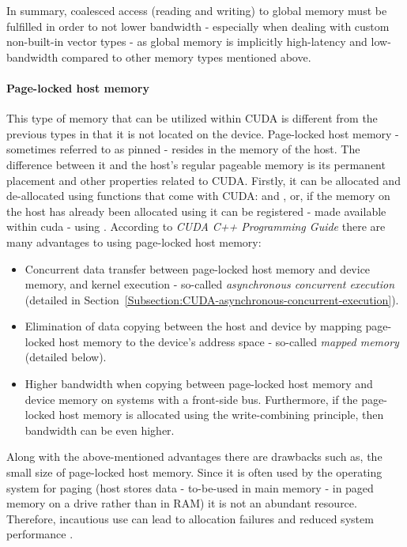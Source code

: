 In summary, coalesced access (reading and writing) to global memory must be fulfilled in order to not lower bandwidth - especially when dealing with custom non-built-in vector types - as global memory is implicitly high-latency and low-bandwidth compared to other memory types mentioned above.

\paragraph{Page-locked host memory}\label{Paragraph:CUDA-memory-management-page-locked-host-memory}
This type of memory that can be utilized within CUDA is different from the previous types in that it is not located on the device. Page-locked host memory - sometimes referred to as pinned - resides in the memory of the host. The difference between it and the host's regular pageable memory is its permanent placement and other properties related to CUDA. Firstly, it can be allocated and de-allocated using functions that come with CUDA:  and , or, if the memory on the host has already been allocated using  it can be registered - made available within cuda - using . According to \emph{CUDA C++ Programming Guide} \cite{NVIDIAMay2022} there are many advantages to using page-locked host memory:

\begin{itemize}
	\item Concurrent data transfer between page-locked host memory and device memory, and kernel execution - so-called \textit{asynchronous concurrent execution} (detailed in Section~\ref{Subsection:CUDA-asynchronous-concurrent-execution}).
	\item Elimination of data copying between the host and device by mapping page-locked host memory to the device's address space - so-called \textit{mapped memory} (detailed below).
	\item Higher bandwidth when copying between page-locked host memory and device memory on systems with a front-side bus. Furthermore, if the page-locked host memory is allocated using the write-combining principle, then bandwidth can be even higher.
\end{itemize}

Along with the above-mentioned advantages there are drawbacks such as, the small size of page-locked host memory. Since it is often used by the operating system for paging (host stores data - to-be-used in main memory - in paged memory on a drive rather than in RAM) it is not an abundant resource. Therefore, incautious use can lead to allocation failures and reduced system performance \cite{NVIDIAMay2022}.

